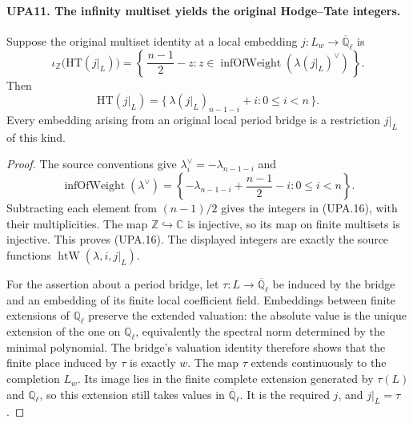 \documentclass[11pt,a4paper]{article}
\numberwithin{equation}{section}
\theoremstyle{remark}\newtheorem{remark}[theorem]{Remark}
\begin{document}
\paragraph{UPA11. The infinity multiset yields the original Hodge--Tate integers.}
\label{claim:UPA11}
Suppose the original multiset identity at a local embedding
$j:L_w\to\overline{\mathbb Q}_\ell$ is
\[
 \iota_{\mathbb Z}\bigl(\mathrm{HT}(j|_L)\bigr)
   =\left\{\,\frac{n-1}{2}-z:
                    z\in\operatorname{infOfWeight}(\lambda(j|_L)^\vee)
     \,\right\}.
 \tag{UPA.15}
\]
Then
\[
 \mathrm{HT}(j|_L)
       =\{\,\lambda(j|_L)_{n-1-i}+i:0\leq i<n\,\}.
 \tag{UPA.16}
\]
Every embedding arising from an original local period bridge
is a restriction $j|_L$ of this kind.
\begin{proof}
The source conventions give
$\lambda^\vee_i=-\lambda_{n-1-i}$ and
\[
 \operatorname{infOfWeight}(\lambda^\vee)
   =\left\{-\lambda_{n-1-i}+\frac{n-1}{2}-i:0\leq i<n\right\}.
 \tag{UPA.17}
\]
Subtracting each element from $(n-1)/2$ gives the integers
in (UPA.16), with their multiplicities.  The map
$\mathbb Z\hookrightarrow\mathbb C$ is injective, so its
map on finite multisets is injective.  This proves
(UPA.16).  The displayed integers are exactly the
source functions $\operatorname{htW}(\lambda,i,j|_L)$.

For the assertion about a period bridge, let $\tau:L\to
\overline{\mathbb Q}_\ell$ be induced by the bridge and
an embedding of its finite local coefficient field.
Embeddings between finite extensions of $\mathbb Q_\ell$
preserve the extended valuation: the absolute value is
the unique extension of the one on $\mathbb Q_\ell$,
equivalently the spectral norm determined by the minimal
polynomial.  The bridge's valuation identity therefore
shows that the finite place induced by $\tau$ is exactly
$w$.  The map $\tau$ extends continuously to the completion
$L_w$.  Its image lies in the finite complete extension
generated by $\tau(L)$ and $\mathbb Q_\ell$, so this
extension still takes values in $\overline{\mathbb Q}_\ell$.
It is the required $j$, and $j|_L=\tau$.
\end{proof}

\end{document}
